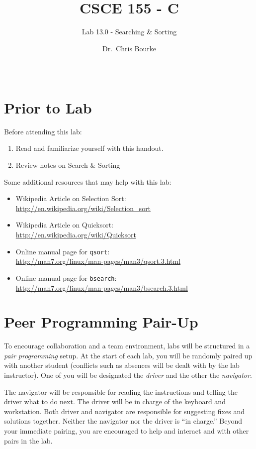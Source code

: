 \documentclass[12pt]{scrartcl}
\title{CSCE 155 - C}
\subtitle{Lab 13.0 - Searching \& Sorting}
\author{Dr.\ Chris Bourke}
\date{~}
\begin{document}
\maketitle

\section*{Prior to Lab}

Before attending this lab:
\begin{enumerate}
  \item Read and familiarize yourself with this handout.
  \item Review notes on Search \& Sorting
\end{enumerate}

Some additional resources that may help with this lab:
\begin{itemize}
  \item Wikipedia Article on Selection Sort: \\
  	\url{http://en.wikipedia.org/wiki/Selection_sort}
  \item Wikipedia Article on Quicksort: \\
  	\url{http://en.wikipedia.org/wiki/Quicksort}
  \item Online manual page for \texttt{qsort}: \\
  	\url{http://man7.org/linux/man-pages/man3/qsort.3.html}
  \item Online manual page for \texttt{bsearch}: \\
  	\url{http://man7.org/linux/man-pages/man3/bsearch.3.html}
\end{itemize}

\section*{Peer Programming Pair-Up}

To encourage collaboration and a team environment, labs will be
structured in a \emph{pair programming} setup.  At the start of
each lab, you will be randomly paired up with another student 
(conflicts such as absences will be dealt with by the lab instructor).
One of you will be designated the \emph{driver} and the other
the \emph{navigator}.  

The navigator will be responsible for reading the instructions and
telling the driver what to do next.  The driver will be in charge of the
keyboard and workstation.  Both driver and navigator are responsible
for suggesting fixes and solutions together.  Neither the navigator
nor the driver is ``in charge.''  Beyond your immediate pairing, you
are encouraged to help and interact and with other pairs in the lab.
\end{document}
